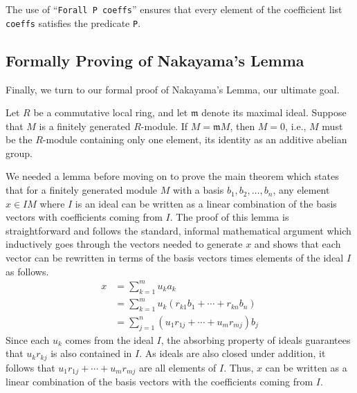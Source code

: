 \documentclass{article}
\begin{document}
The use of  ``\verb|Forall P coeffs|'' ensures that every element of the coefficient list
\texttt{coeffs} satisfies the predicate \texttt{P}.  

\subsection{Formally Proving of Nakayama's Lemma}


Finally, we turn to our formal proof of Nakayama's Lemma, our ultimate goal.

\begin{nak*}
Let $R$ be a commutative local ring, and let $\mathfrak{m}$ denote its maximal ideal. 
Suppose that $M$ is a finitely generated $R$-module. 
If $M = \mathfrak{m} M$, then $M = 0$, i.e., $M$ must be the $R$-module containing only one element, its identity as an additive abelian group. 
\end{nak*}

We needed a lemma before moving on to prove the main theorem which states that
for a finitely generated module \(M\) with a basis
\(b_{1}, b_{2}, \dots, b_{n}\), any element \(x\in I M\) where \(I\) is an
ideal can be written as a linear combination of the basis vectors with
coefficients coming from \(I\). The proof of this lemma is straightforward and
follows the standard, informal mathematical argument which inductively goes
through the vectors needed to generate \(x\) and shows that each vector can be
rewritten in terms of the basis vectors times elements of the ideal \(I\) as
follows.
\begin{align*}
  x & = \sum_{k=1}^{m} u_{k} a_{k} \\
    & = \sum_{k=1}^{m} u_{k} (r_{k1} b_{1} + \cdots + r_{kn} b_{n}) \\
    & = \sum_{j=1}^{n} (u_{1} r_{1j} + \cdots + u_{m} r_{mj}) b_{j}
\end{align*}
Since each \(u_{k}\) comes from the ideal \(I\), the absorbing property of
ideals guarantees that \(u_{k} r_{k j}\) is also contained in \(I\). As ideals
are also closed under addition, it follows that \(u_{1} r_{1j} + \cdots +
u_{m} r_{m j}\) are all elements of \(I\). Thus, \(x\) can be written as a
linear combination of the basis vectors with the coefficients coming from
\(I\).
\end{document}
